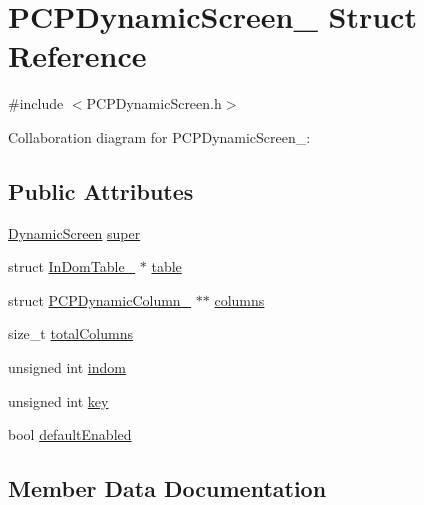 \hypertarget{structPCPDynamicScreen__}{}\section{P\+C\+P\+Dynamic\+Screen\+\_\+ Struct Reference}
\label{structPCPDynamicScreen__}


{\ttfamily \#include $<$P\+C\+P\+Dynamic\+Screen.\+h$>$}



Collaboration diagram for P\+C\+P\+Dynamic\+Screen\+\_\+\+:
\subsection*{Public Attributes}
\begin{DoxyCompactItemize}
\item 
\hyperlink{DynamicScreen_8h_a9b10b5a0b32fbb6fe6af7f0571ae6b25}{Dynamic\+Screen} \hyperlink{structPCPDynamicScreen___a8d1b41f3948fbd98ef51a0e85a6cd43e}{super}
\item 
struct \hyperlink{structInDomTable__}{In\+Dom\+Table\+\_\+} $\ast$ \hyperlink{structPCPDynamicScreen___a014d364b7f49e162b27aa1806b20cd98}{table}
\item 
struct \hyperlink{structPCPDynamicColumn__}{P\+C\+P\+Dynamic\+Column\+\_\+} $\ast$$\ast$ \hyperlink{structPCPDynamicScreen___acb2aa9babd2a78bece26b691c636a03a}{columns}
\item 
size\+\_\+t \hyperlink{structPCPDynamicScreen___a27364df804ffef77240461a889f606fc}{total\+Columns}
\item 
unsigned int \hyperlink{structPCPDynamicScreen___a83897a081045ce4e939fed9b80276013}{indom}
\item 
unsigned int \hyperlink{structPCPDynamicScreen___a5d0d249e2ba812b9a77bd51a2bf16510}{key}
\item 
bool \hyperlink{structPCPDynamicScreen___ae2b4267c09b620cbb1956f9befb98813}{default\+Enabled}
\end{DoxyCompactItemize}


\subsection{Member Data Documentation}
\mbox{\label{structPCPDynamicScreen___acb2aa9babd2a78bece26b691c636a03a}} 
